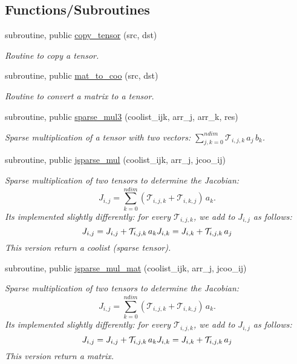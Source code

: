 \subsection*{Functions/\+Subroutines}
\begin{DoxyCompactItemize}
\item 
subroutine, public \hyperlink{namespacetensor_a4a88ee8077278486c5128ad97617969e}{copy\+\_\+tensor} (src, dst)
\begin{DoxyCompactList}\small\item\em Routine to copy a tensor. \end{DoxyCompactList}\item 
subroutine, public \hyperlink{namespacetensor_a75d1a9ca8b39e9ad4b151a7b4b45c70f}{mat\+\_\+to\+\_\+coo} (src, dst)
\begin{DoxyCompactList}\small\item\em Routine to convert a matrix to a tensor. \end{DoxyCompactList}\item 
subroutine, public \hyperlink{namespacetensor_a11054027a386918658f8948231af53b1}{sparse\+\_\+mul3} (coolist\+\_\+ijk, arr\+\_\+j, arr\+\_\+k, res)
\begin{DoxyCompactList}\small\item\em Sparse multiplication of a tensor with two vectors\+: ${\displaystyle \sum_{j,k=0}^{ndim}} \mathcal{T}_{i,j,k} \, a_j \,b_k$. \end{DoxyCompactList}\item 
subroutine, public \hyperlink{namespacetensor_add2a6aa993cd8a23be60d1643b5c7942}{jsparse\+\_\+mul} (coolist\+\_\+ijk, arr\+\_\+j, jcoo\+\_\+ij)
\begin{DoxyCompactList}\small\item\em Sparse multiplication of two tensors to determine the Jacobian\+: \[J_{i,j} = {\displaystyle \sum_{k=0}^{ndim}} \left( \mathcal{T}_{i,j,k} + \mathcal{T}_{i,k,j} \right) \, a_k.\] It\textquotesingle{}s implemented slightly differently\+: for every $\mathcal{T}_{i,j,k}$, we add to $J_{i,j}$ as follows\+: \[J_{i,j} = J_{i,j} + \mathcal{T}_{i,j,k} \, a_k \\ J_{i,k} = J_{i,k} + \mathcal{T}_{i,j,k} \, a_j\] This version return a coolist (sparse tensor). \end{DoxyCompactList}\item 
subroutine, public \hyperlink{namespacetensor_a4135cf70df5030070922ff199c79cc03}{jsparse\+\_\+mul\+\_\+mat} (coolist\+\_\+ijk, arr\+\_\+j, jcoo\+\_\+ij)
\begin{DoxyCompactList}\small\item\em Sparse multiplication of two tensors to determine the Jacobian\+: \[J_{i,j} = {\displaystyle \sum_{k=0}^{ndim}} \left( \mathcal{T}_{i,j,k} + \mathcal{T}_{i,k,j} \right) \, a_k.\] It\textquotesingle{}s implemented slightly differently\+: for every $\mathcal{T}_{i,j,k}$, we add to $J_{i,j}$ as follows\+: \[J_{i,j} = J_{i,j} + \mathcal{T}_{i,j,k} \, a_k \\ J_{i,k} = J_{i,k} + \mathcal{T}_{i,j,k} \, a_j\] This version return a matrix. \end{DoxyCompactList}\item 

\end{DoxyCompactItemize}
